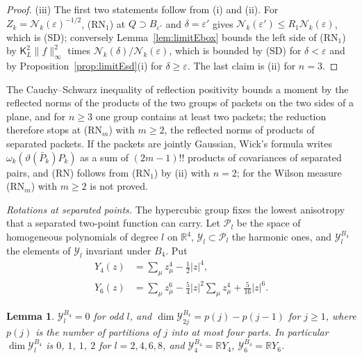 \documentclass[aps,prd,twocolumn,superscriptaddress,nofootinbib,longbibliography,floatfix,amsmath,amssymb,10pt]{revtex4-2}
\newtheorem{lemma}[theorem]{Lemma}
\theoremstyle{definition}
\theoremstyle{remark}
\newcommand{\R}{\mathbb{R}}
\begin{document}
\begin{proof}
(iii) The first two statements follow from (i) and (ii). For $Z_k=\mathcal
N_k(\varepsilon)^{-1/2}$, (RN$_1$) at $Q\supset B_{\varepsilon'}$ and
$\delta=\varepsilon'$ gives $\mathcal N_k(\varepsilon')\le R_1\mathcal
N_k(\varepsilon)$, which is (SD); conversely Lemma~\ref{lem:limitEbox}
bounds the left side of (RN$_1$) by $\mathsf K_L^2\|f\|_\infty^2$ times
$\mathcal N_k(\delta)/\mathcal N_k(\varepsilon)$, which is bounded by (SD)
for $\delta<\varepsilon$ and by Proposition~\ref{prop:limitEsd}(i) for
$\delta\ge\varepsilon$. The last claim is (ii) for $n=3$.
\end{proof}

The Cauchy--Schwarz inequality of reflection positivity bounds a moment by
the reflected norms of the products of the two groups of packets on the two
sides of a plane, and for $n\ge3$ one group contains at least two packets;
the reduction therefore stops at (RN$_m$) with $m\ge2$, the reflected norms
of products of separated packets. If the packets are jointly Gaussian,
Wick's formula writes $\omega_k(\vartheta(\bar P_k)P_k)$ as a sum of
$(2m-1)!!$ products of covariances of separated pairs, and (RN) follows from
(RN$_1$) by (ii) with $n=2$; for the Wilson measure (RN$_m$) with $m\ge2$ is
not proved.

\emph{Rotations at separated points.} The hypercubic group fixes the
lowest anisotropy that a separated two-point function can carry. Let
$\mathcal P_l$ be the space of homogeneous polynomials of degree $l$ on
$\R^4$, $\mathcal Y_l\subset\mathcal P_l$ the harmonic ones, and
$\mathcal Y_l^{B_4}$ the elements of $\mathcal Y_l$ invariant under $B_4$.
Put
\[
\begin{split}
Y_4(z)&=\sum_\mu z_\mu^4-\tfrac12|z|^4,\\
Y_6(z)&=\sum_\mu z_\mu^6-\tfrac54|z|^2\sum_\mu z_\mu^4+\tfrac5{16}|z|^6 .
\end{split}
\]

\begin{lemma}\label{lem:limitEharm}
$\mathcal Y_l^{B_4}=0$ for odd $l$, and $\dim\mathcal Y_{2j}^{B_4}=
p(j)-p(j-1)$ for $j\ge1$, where $p(j)$ is the number of partitions of $j$
into at most four parts. In particular $\dim\mathcal Y_l^{B_4}$ is $0$, $1$,
$1$, $2$ for $l=2,4,6,8$, and $\mathcal Y_4^{B_4}=\R Y_4$,
$\mathcal Y_6^{B_4}=\R Y_6$.
\end{lemma}
\end{document}
